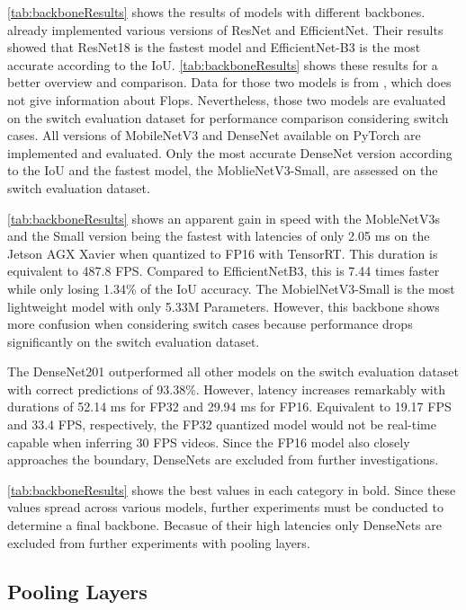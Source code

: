 \autoref{tab:backboneResults} shows the results of models with different backbones.
\cite{tepNet2024} already implemented various versions of ResNet and EfficientNet.
Their results showed that ResNet18 is the fastest model and EfficientNet-B3 is the most accurate according to the \ac{IoU}.
\autoref{tab:backboneResults} shows these results for a better overview and comparison.
Data for those two models is from \cite{tepNet2024}, which does not give information about Flops.
Nevertheless, those two models are evaluated on the switch evaluation dataset for performance comparison considering switch cases.
All versions of MobileNetV3 and DenseNet available on PyTorch are implemented and evaluated.
Only the most accurate DenseNet version according to the \ac{IoU} and the fastest model, the MoblieNetV3-Small, are assessed on the switch evaluation dataset.

\autoref{tab:backboneResults} shows an apparent gain in speed with the MobleNetV3s and the Small version being the fastest with latencies of only 2.05 ms on the Jetson AGX Xavier when quantized to FP16 with TensorRT.
This duration is equivalent to 487.8 \ac{FPS}.
Compared to EfficientNetB3, this is 7.44 times faster while only losing 1.34\% of the \ac{IoU} accuracy.
The MobielNetV3-Small is the most lightweight model with only 5.33M Parameters.
However, this backbone shows more confusion when considering switch cases because performance drops significantly on the switch evaluation dataset.

The DenseNet201 outperformed all other models on the switch evaluation dataset with correct predictions of 93.38\%.
However, latency increases remarkably with durations of 52.14 ms for FP32 and 29.94 ms for FP16.
Equivalent to 19.17 \ac{FPS} and 33.4 \ac{FPS}, respectively, the FP32 quantized model would not be real-time capable when inferring 30 \ac{FPS} videos.
Since the FP16 model also closely approaches the boundary, DenseNets are excluded from further investigations.

\autoref{tab:backboneResults} shows the best values in each category in bold.
Since these values spread across various models, further experiments must be conducted to determine a final backbone.
Becasue of their high latencies only DenseNets are excluded from further experiments with pooling layers.

\subsection{Pooling Layers}

